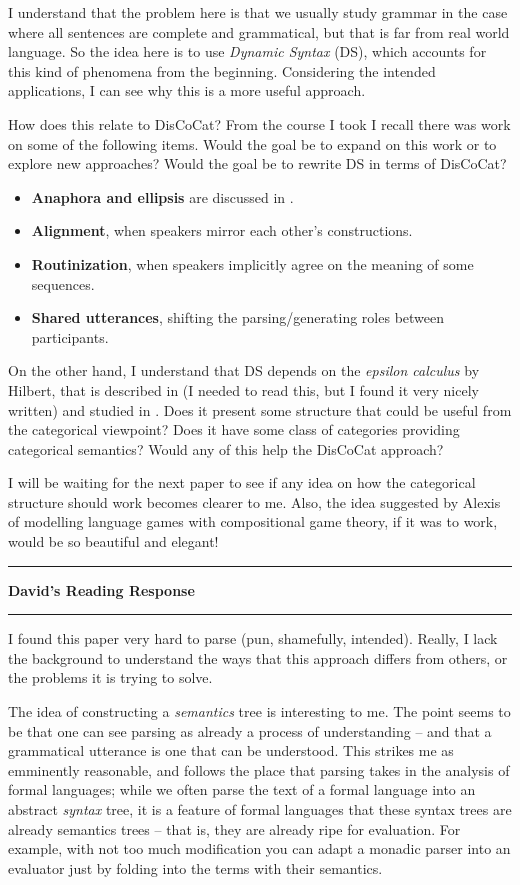 \documentclass{amsart}
\newcommand{\iam}[1]{
  \vspace{0.25em}
  \hrule
  \vspace{0.25em}
  \textbf{{#1}'s Reading Response}
  \vspace{0.25em}
  \hrule
  \vspace{1em}
}
\begin{document}
I understand that the problem here is that we usually study grammar in
the case where all sentences are complete and grammatical, but that is
far from real world language.  So the idea here is to use \emph{Dynamic
  Syntax} (DS), which accounts for this kind of phenomena from the beginning.
Considering the intended applications, I can see why this is a more useful
approach.

How does this relate to DisCoCat? From the course I took I recall
there was work on some of the following items. Would the goal be to
expand on this work or to explore new approaches? Would the goal be to
rewrite DS in terms of DisCoCat?

\begin{itemize}
\item \textbf{Anaphora and ellipsis} are discussed in \cite{GijsSadrzadeh19}.
\item \textbf{Alignment}, when speakers mirror each other's constructions.
\item \textbf{Routinization}, when speakers implicitly agree on the
  meaning of some sequences.
\item \textbf{Shared utterances}, shifting the parsing/generating roles between
  participants.
\end{itemize}

On the other hand, I understand that DS depends on the \emph{epsilon
  calculus} by Hilbert, that is described in \cite{AvigadStanford} (I
needed to read this, but I found it very nicely written) and studied
in \cite{MeyerViol}.  Does it present some structure that could be
useful from the categorical viewpoint? Does it have some class of
categories providing categorical semantics? Would any of this help the
DisCoCat approach?

I will be waiting for the next paper to see if any idea on how the
categorical structure should work becomes clearer to me.  Also, the
idea suggested by Alexis of modelling language games with compositional
game theory, if it was to work, would be so beautiful and elegant!

\iam{David}
I found this paper very hard to parse (pun, shamefully, intended). Really, I lack the background to understand the ways that this approach differs from others, or the problems it is trying to solve.

The idea of constructing a \emph{semantics} tree is interesting to me. The point seems to be that one can see parsing as already a process of understanding -- and that a grammatical utterance is one that can be understood. This strikes me as emminently reasonable, and follows the place that parsing takes in the analysis of formal languages; while we often parse the text of a formal language into an abstract \emph{syntax} tree, it is a feature of formal languages that these syntax trees are already semantics trees -- that is, they are already ripe for evaluation. For example, with not too much modification you can adapt a monadic parser into an evaluator just by folding into the terms with their semantics.
\end{document}
